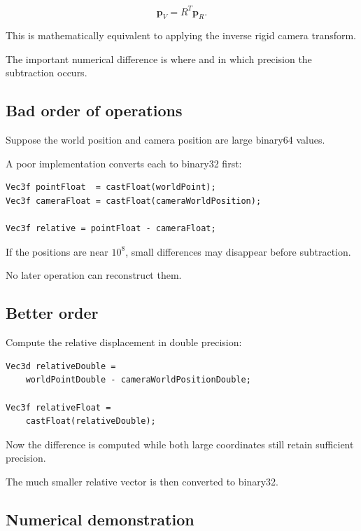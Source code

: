 \[
 \boxed{ \mathbf p_V=R^T\mathbf p_R }.
\]

This is mathematically equivalent to applying the inverse rigid camera transform.

The important numerical difference is where and in which precision the subtraction occurs.

\subsection{Bad order of operations}\label{02-foundations-ii-ch036-bad-order-of-operations}

\hypertarget{02-foundations-ii-ch036-bad-order-of-operations}{}

Suppose the world position and camera position are large binary64 values.

A poor implementation converts each to binary32 first:

\begin{verbatim}
Vec3f pointFloat  = castFloat(worldPoint);
Vec3f cameraFloat = castFloat(cameraWorldPosition);

Vec3f relative = pointFloat - cameraFloat;
\end{verbatim}

If the positions are near \(10^8\), small differences may disappear before subtraction.

No later operation can reconstruct them.

\subsection{Better order}\label{02-foundations-ii-ch036-better-order}

\hypertarget{02-foundations-ii-ch036-better-order}{}

Compute the relative displacement in double precision:

\begin{verbatim}
Vec3d relativeDouble =
    worldPointDouble - cameraWorldPositionDouble;

Vec3f relativeFloat =
    castFloat(relativeDouble);
\end{verbatim}

Now the difference is computed while both large coordinates still retain sufficient precision.

The much smaller relative vector is then converted to binary32.

\subsection{Numerical demonstration}\label{02-foundations-ii-ch036-numerical-demonstration}

